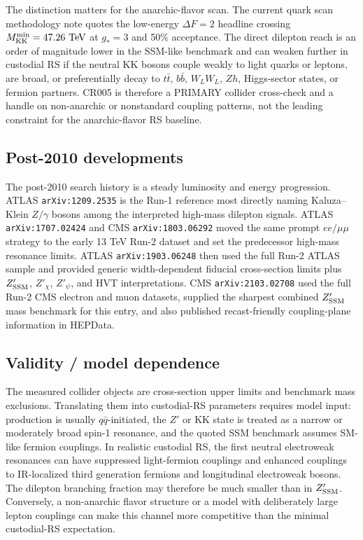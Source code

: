 The distinction matters for the anarchic-flavor scan.  The current quark
scan methodology note quotes the low-energy \(\Delta F=2\) headline crossing
\(M_{\rm KK}^{\min}=47.26~{\rm TeV}\) at \(g_*=3\) and 50\% acceptance.
The direct dilepton reach is an order of magnitude lower in the SSM-like
benchmark and can weaken further in custodial RS if the neutral KK bosons
couple weakly to light quarks or leptons, are broad, or preferentially decay
to \(t\bar t\), \(b\bar b\), \(W_LW_L\), \(Zh\), Higgs-sector states, or
fermion partners.  CR005 is therefore a PRIMARY collider cross-check and a
handle on non-anarchic or nonstandard coupling patterns, not the leading
constraint for the anarchic-flavor RS baseline.

\subsection*{Post-2010 developments}
The post-2010 search history is a steady luminosity and energy progression.
ATLAS \texttt{arXiv:1209.2535} is the Run-1 reference most directly naming
Kaluza--Klein \(Z/\gamma\) bosons among the interpreted high-mass dilepton
signals.  ATLAS \texttt{arXiv:1707.02424} and CMS
\texttt{arXiv:1803.06292} moved the same prompt \(ee/\mu\mu\) strategy to
the early 13 TeV Run-2 dataset and set the predecessor high-mass resonance
limits.  ATLAS \texttt{arXiv:1903.06248} then used the full Run-2 ATLAS
sample and provided generic width-dependent fiducial cross-section limits
plus \(Z'_{\rm SSM}\), \(Z'_\chi\), \(Z'_\psi\), and HVT interpretations.
CMS \texttt{arXiv:2103.02708} used the full Run-2 CMS electron and muon
datasets, supplied the sharpest combined \(Z'_{\rm SSM}\) mass benchmark for
this entry, and also published recast-friendly coupling-plane information in
HEPData.

\subsection*{Validity / model dependence}
The measured collider objects are cross-section upper limits and benchmark
mass exclusions.  Translating them into custodial-RS parameters requires
model input: production is usually \(q\bar q\)-initiated, the \(Z'\) or KK
state is treated as a narrow or moderately broad spin-1 resonance, and the
quoted SSM benchmark assumes SM-like fermion couplings.  In realistic
custodial RS, the first neutral electroweak resonances can have suppressed
light-fermion couplings and enhanced couplings to IR-localized third
generation fermions and longitudinal electroweak bosons.  The dilepton
branching fraction may therefore be much smaller than in \(Z'_{\rm SSM}\).
Conversely, a non-anarchic flavor structure or a model with deliberately
large lepton couplings can make this channel more competitive than the
minimal custodial-RS expectation.

